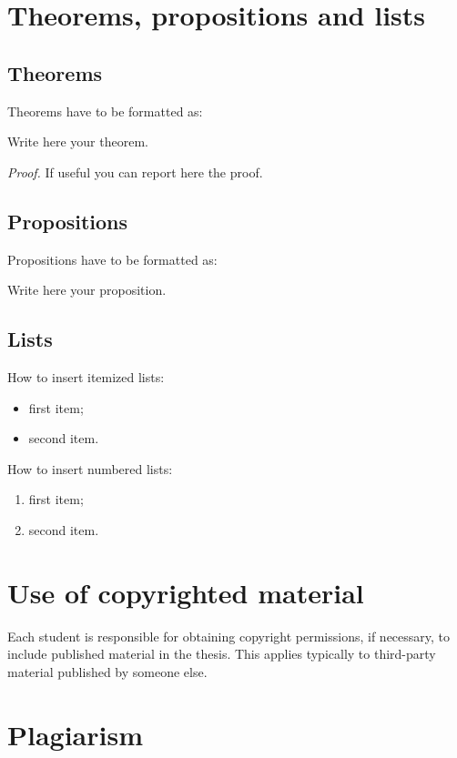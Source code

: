 \documentclass{Configuration_Files/PoliMi3i_thesis}
\begin{document}
\vspace{5mm}

\section{Theorems, propositions and lists}

\subsection{Theorems}
Theorems have to be formatted as:
\begin{theorem}
\label{a_theorem}
Write here your theorem. 
\end{theorem}
\textit{Proof.} If useful you can report here the proof.

\subsection{Propositions}
Propositions have to be formatted as:
\begin{proposition}
Write here your proposition.
\end{proposition}

\subsection{Lists}
How to  insert itemized lists:
\begin{itemize}
    \item first item;
    \item second item.
\end{itemize}
How to insert numbered lists:
\begin{enumerate}
    \item first item;
    \item second item.
\end{enumerate}

\section{Use of copyrighted material}

Each student is responsible for obtaining copyright permissions, if necessary, to include published material in the thesis.
This applies typically to third-party material published by someone else.

\section{Plagiarism}
\end{document}
